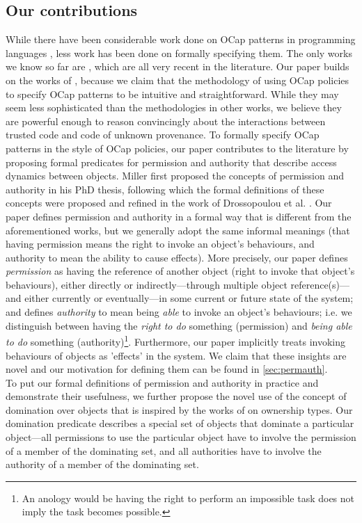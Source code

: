 \documentclass[a4paper,11pt,twoside]{article}
\begin{document}
\subsection{Our contributions}
While there have been considerable work done on OCap patterns in programming languages \cite{miller2003b,miller2006,murray2010}, less work has been done on formally specifying them. The only works we know so far are \cite{drossopoulou2015b,devriese2016,swasey2017}, which are all very recent in the literature. Our paper builds on the works of \cite{drossopoulou2015b}, because we claim that the methodology of using OCap policies to specify OCap patterns to be intuitive and straightforward. While they may seem less sophisticated than the methodologies in other works, we believe they are powerful enough to reason convincingly about the interactions between trusted code and code of unknown provenance. To formally specify OCap patterns in the style of OCap policies, our paper contributes to the literature by proposing formal predicates for permission and authority that describe access dynamics between objects. Miller first proposed the concepts of permission and authority in his PhD thesis\cite{miller2006}, following which the formal definitions of these concepts were proposed and refined in the work of Drossopoulou et al. \cite{drossopoulou2016}. Our paper defines permission and authority in a formal way that is different from the aforementioned works, but we generally adopt the same informal meanings (that having permission means the right to invoke an object's behaviours, and authority to mean the ability to cause effects). More precisely, our paper defines \textit{permission} as having the reference of another object (right to invoke that object's behaviours), either directly or indirectly---through multiple object reference(s)---and either currently or eventually---in some current or future state of the system; and defines \textit{authority} to mean being \textit{able} to invoke an object's behaviours; i.e. we distinguish between having the \textit{right to do} something (permission) and \textit{being able to do} something (authority)\footnote{An anology would be having the right to perform an impossible task does not imply the task becomes possible.}. Furthermore, our paper implicitly treats invoking behaviours of objects as 'effects' in the system. We claim that these insights are novel and our motivation for defining them can be found in \cref{sec:permauth}.\\

To put our formal definitions of permission and authority in practice and demonstrate their usefulness, we further propose the novel use of the concept of domination over objects that is inspired by the works of \cite{clarke1998} on ownership types. Our domination predicate describes a special set of objects that dominate a particular object---all permissions to use the particular object have to involve the permission of a member of the dominating set, and all authorities have to involve the authority of a member of the dominating set.\\
\end{document}
